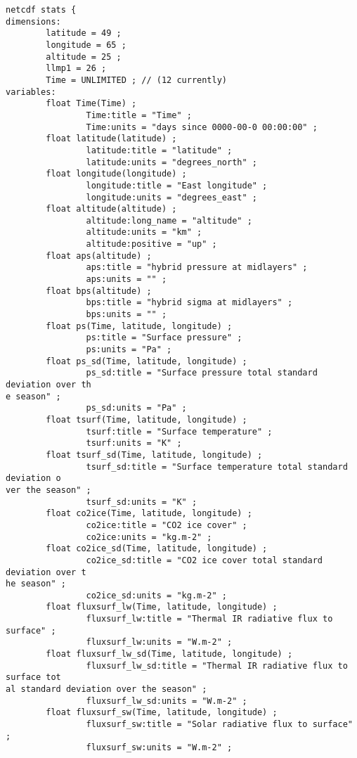 {\footnotesize
\begin{verbatim}
netcdf stats {
dimensions:
        latitude = 49 ;
        longitude = 65 ;
        altitude = 25 ;
        llmp1 = 26 ;
        Time = UNLIMITED ; // (12 currently)
variables:
        float Time(Time) ;
                Time:title = "Time" ;
                Time:units = "days since 0000-00-0 00:00:00" ;
        float latitude(latitude) ;
                latitude:title = "latitude" ;
                latitude:units = "degrees_north" ;
        float longitude(longitude) ;
                longitude:title = "East longitude" ;
                longitude:units = "degrees_east" ;
        float altitude(altitude) ;
                altitude:long_name = "altitude" ;
                altitude:units = "km" ;
                altitude:positive = "up" ;
        float aps(altitude) ;
                aps:title = "hybrid pressure at midlayers" ;
                aps:units = "" ;
        float bps(altitude) ;
                bps:title = "hybrid sigma at midlayers" ;
                bps:units = "" ;
        float ps(Time, latitude, longitude) ;
                ps:title = "Surface pressure" ;
                ps:units = "Pa" ;
        float ps_sd(Time, latitude, longitude) ;
                ps_sd:title = "Surface pressure total standard deviation over th
e season" ;
                ps_sd:units = "Pa" ;
        float tsurf(Time, latitude, longitude) ;
                tsurf:title = "Surface temperature" ;
                tsurf:units = "K" ;
        float tsurf_sd(Time, latitude, longitude) ;
                tsurf_sd:title = "Surface temperature total standard deviation o
ver the season" ;
                tsurf_sd:units = "K" ;
        float co2ice(Time, latitude, longitude) ;
                co2ice:title = "CO2 ice cover" ;
                co2ice:units = "kg.m-2" ;
        float co2ice_sd(Time, latitude, longitude) ;
                co2ice_sd:title = "CO2 ice cover total standard deviation over t
he season" ;
                co2ice_sd:units = "kg.m-2" ;
        float fluxsurf_lw(Time, latitude, longitude) ;
                fluxsurf_lw:title = "Thermal IR radiative flux to surface" ;
                fluxsurf_lw:units = "W.m-2" ;
        float fluxsurf_lw_sd(Time, latitude, longitude) ;
                fluxsurf_lw_sd:title = "Thermal IR radiative flux to surface tot
al standard deviation over the season" ;
                fluxsurf_lw_sd:units = "W.m-2" ;
        float fluxsurf_sw(Time, latitude, longitude) ;
                fluxsurf_sw:title = "Solar radiative flux to surface" ;
                fluxsurf_sw:units = "W.m-2" ;

\end{verbatim}}
